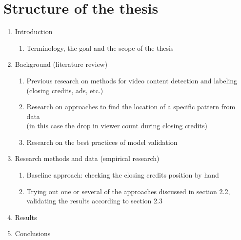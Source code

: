 \documentclass[12pt,a4paper,english,oneside]{article}
\begin{document}
\section{Structure of the thesis}

\begin{enumerate}
\item Introduction 
\begin{enumerate}
    \item Terminology, the goal and the scope of the thesis
\end{enumerate}
\item Background (literature review) 
    \begin{enumerate}
    \item Previous research on methods for video content detection and labeling
    \\(closing credits, ads, etc.)
    \item Research on approaches to find the location of a specific pattern from data
    \\(in this case the drop in viewer count during closing credits)
    \item Research on the best practices of model validation
    \end{enumerate}
\item Research methods and data (empirical research)
\begin{enumerate}
    \item Baseline approach: checking the closing credits position by hand
    \item Trying out one or several of the approaches discussed in section 2.2,
    \\validating the results according to section 2.3
\end{enumerate}
\item Results
\item Conclusions
\end{enumerate}

%


% 

\renewcommand{\refname}{References}  %

%

\end{document}
